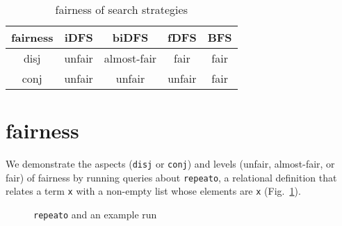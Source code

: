 \documentclass[format=acmlarge, review=true, authordraft=true]{acmart}
\newcommand{\conde}{\texttt{cond$^e$} }
\newcommand{\conj}{\texttt{conj}}
\newcommand{\disj}{\texttt{disj}}
\begin{document}
\begin{table}
	\begin{tabular}{|c|c|c|c|c|}
		\hline 
		fairness & iDFS & biDFS & fDFS & BFS \\ 
		\hline 
		disj & unfair & almost-fair & fair & fair \\ 
		\hline 
		conj & unfair & unfair & unfair & fair \\ 
		\hline 
	\end{tabular} 
	\caption{fairness of search strategies}
	\label{fairness}
\end{table}


\section{fairness}

We demonstrate the aspects (\disj{} or \conj{}) and levels (unfair, almost-fair, or fair) of fairness by running queries about \texttt{repeato}, a relational definition that relates a term \texttt{x} with a non-empty list whose elements are \texttt{x} (Fig.~\ref{repeato}).

\begin{figure}
	
	\caption{\texttt{repeato} and an example run}
	\label{repeato}
\end{figure}
\end{document}
